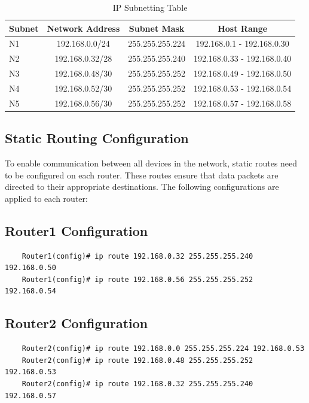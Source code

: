 \documentclass[a4paper,12pt]{article}
\begin{document}
\begin{table}[h!]
    \centering
    \caption{IP Subnetting Table}
    \begin{tabular}{lccc}
        \toprule
        \textbf{Subnet} & \textbf{Network Address} & \textbf{Subnet Mask} & \textbf{Host Range}         \\
        \midrule
        N1              & 192.168.0.0/24           & 255.255.255.224      & 192.168.0.1 - 192.168.0.30  \\
        N2              & 192.168.0.32/28          & 255.255.255.240      & 192.168.0.33 - 192.168.0.40 \\
        N3              & 192.168.0.48/30          & 255.255.255.252      & 192.168.0.49 - 192.168.0.50 \\
        N4              & 192.168.0.52/30          & 255.255.255.252      & 192.168.0.53 - 192.168.0.54 \\
        N5              & 192.168.0.56/30          & 255.255.255.252      & 192.168.0.57 - 192.168.0.58 \\
        \bottomrule
    \end{tabular}
\end{table}


\subsection*{Static Routing Configuration}
To enable communication between all devices in the network, static routes need to be configured on each router. These routes ensure that data packets are directed to their appropriate destinations. The following configurations are applied to each router:

\subsection*{Router1 Configuration}
\begin{verbatim}
    Router1(config)# ip route 192.168.0.32 255.255.255.240 192.168.0.50
    Router1(config)# ip route 192.168.0.56 255.255.255.252 192.168.0.54
    \end{verbatim}

\subsection*{Router2 Configuration}
\begin{verbatim}
    Router2(config)# ip route 192.168.0.0 255.255.255.224 192.168.0.53
    Router2(config)# ip route 192.168.0.48 255.255.255.252 192.168.0.53
    Router2(config)# ip route 192.168.0.32 255.255.255.240 192.168.0.57
    \end{verbatim}
\end{document}
